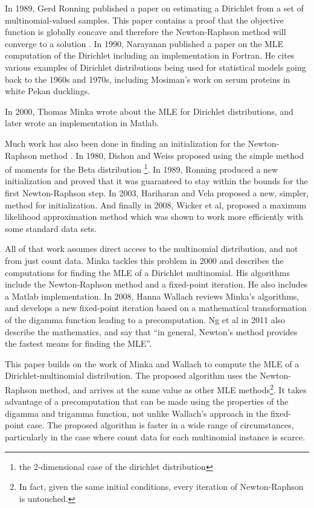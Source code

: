 \documentclass[twoside]{article}
\begin{document}
In 1989, Gerd Ronning published a paper on estimating a Dirichlet from a set of multinomial-valued samples\cite{ronning}.  This paper contains a proof that the objective function is globally concave and therefore the Newton-Raphson method will converge to a solution \cite[pg 73]{ng}.  In 1990, Narayanan published a paper on the MLE computation of the Dirichlet including an implementation in Fortran\cite{narayanan}. He cites various examples of Dirichlet distributions being used for statistical models going back to the 1960s and 1970s, including Mosiman's work on serum proteins in white Pekan ducklings\cite[pg 8]{ng}.

In 2000, Thomas Minka\cite{minka} wrote about the MLE for Dirichlet distributions, and later wrote an implementation in Matlab.

Much work has also been done in finding an initialization for the Newton-Raphson method \cite[pg 74-54]{ng}.  In 1980, Dishon and Weiss\cite{dishon} proposed using the simple method of moments for the Beta distribution \footnote{the 2-dimensional case of the dirichlet distribution}.  In 1989, Ronning\cite{ronning} produced a new initialization and proved that it was guaranteed to stay within the bounds for the first Newton-Raphson step.  In 2003, Hariharan and Vela\cite{hariharan} proposed a new, simpler, method for initialization.  And finally in 2008, Wicker et al\cite{wicker}, proposed a maximum likelihood approximation method which was shown to work more efficiently with some standard data sets.

All of that work assumes direct access to the multinomial distribution, and not from just count data.  Minka\cite{minka} tackles this problem in 2000 and describes the computations for finding the MLE of a Dirichlet multinomial.   His algorithms include the Newton-Raphson method and a fixed-point iteration.  He also includes a Matlab implementation.  In 2008, Hanna Wallach reviews Minka's algorithms, and develops a new fixed-point iteration based on a mathematical transformation of the digamma function leading to a precomputation.  Ng et al\cite{ng} in 2011 also describe the mathematics, and say that ``in general, Newton's method provides the fastest means for finding the MLE''.

This paper builds on the work of Minka and Wallach to compute the MLE of a Dirichlet-multinomial distribution.  The proposed algorithm uses the Newton-Raphson method, and arrives at the same value as other MLE methods\footnote{In fact, given the same initial conditions, every iteration of Newton-Raphson is untouched.}.  It takes advantage of a precomputation that can be made using the properties of the digamma and trigamma function, not unlike Wallach's approach in the fixed-point case.  The proposed algorithm is faster in a wide range of circumstances, particularly in the case where count data for each multinomial instance is scarce.
\end{document}

